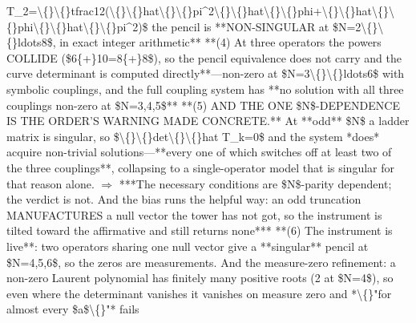 \begin{description}
T\_2=\textbackslash\{\}\textbackslash\{\}tfrac12(\textbackslash\{\}\textbackslash\{\}hat\textbackslash\{\}\textbackslash\{\}pi\textasciicircum{}2\textbackslash\{\}\textbackslash\{\}hat\textbackslash\{\}\textbackslash\{\}phi+\textbackslash\{\}\textbackslash\{\}hat\textbackslash\{\}\textbackslash\{\}phi\textbackslash\{\}\textbackslash\{\}hat\textbackslash\{\}\textbackslash\{\}pi\textasciicircum{}2)\$ the pencil is **NON-SINGULAR at \$N=2\textbackslash\{\}\textbackslash\{\}ldots8\$, in exact integer arithmetic**  **(4) At three operators the powers COLLIDE (\$6\{+\}10=8\{+\}8\$), so the pencil equivalence does not carry and the curve determinant is computed directly**---non-zero at \$N=3\textbackslash\{\}\textbackslash\{\}ldots6\$ with symbolic couplings, and the full coupling system has **no solution with all three couplings non-zero at \$N=3,4,5\$**  **(5) AND THE ONE \$N\$-DEPENDENCE IS THE ORDER'S WARNING MADE CONCRETE.** At **odd** \$N\$ a ladder matrix is singular, so \$\textbackslash\{\}\textbackslash\{\}det\textbackslash\{\}\textbackslash\{\}hat T\_k=0\$ and the system *does* acquire non-trivial solutions---**every one of which switches off at least two of the three couplings**, collapsing to a single-operator model that is singular for that reason alone. \ensuremath{\Rightarrow} ***The necessary conditions are \$N\$-parity dependent; the verdict is not. And the bias runs the helpful way: an odd truncation MANUFACTURES a null vector the tower has not got, so the instrument is tilted toward the affirmative and still returns none***  **(6) The instrument is live**: two operators sharing one null vector give a **singular** pencil at \$N=4,5,6\$, so the zeros are measurements. And the measure-zero refinement: a non-zero Laurent polynomial has finitely many positive roots (2 at \$N=4\$), so even where the determinant vanishes it vanishes on measure zero and *\textbackslash\{\}"for almost every \$a\$\textbackslash\{\}"* fails

\end{description}
